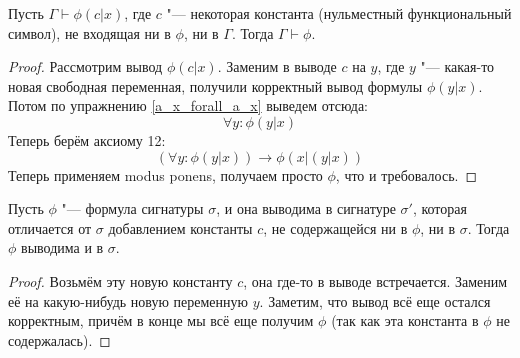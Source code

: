 \begin{lemma}\label{fresh_const_lemma}
	Пусть $\Gamma \vdash \phi(c|x)$, где $c$ "--- некоторая константа (нульместный функциональный символ), не входящая ни в $\phi$, ни в $\Gamma$.
	Тогда $\Gamma \vdash \phi$.
\end{lemma}
\begin{proof}
	Рассмотрим вывод $\phi(c|x)$.
	Заменим в выводе $c$ на $y$, где $y$ "--- какая-то новая свободная переменная, получили корректный вывод формулы $\phi(y|x)$.
	Потом по упражнению \ref{a_x_forall_a_x} выведем отсюда:
	\[ \forall y \colon \phi(y|x) \]
	Теперь берём аксиому 12:
	\[ (\forall y \colon \phi(y|x)) \to \phi(x|(y|x)) \]
	Теперь применяем modus ponens, получаем просто $\phi$, что и требовалось.
\end{proof}

\begin{lemma}
	Пусть $\phi$ "--- формула сигнатуры $\sigma$, и она выводима в сигнатуре $\sigma'$, которая отличается от $\sigma$ добавлением константы $c$,
	не содержащейся ни в $\phi$, ни в $\sigma$.
	Тогда $\phi$ выводима и в $\sigma$.
\end{lemma}
\begin{proof}
	Возьмём эту новую константу $c$, она где-то в выводе встречается.
	Заменим её на какую-нибудь новую переменную $y$.
	Заметим, что вывод всё еще остался корректным, причём в конце мы всё еще получим $\phi$
	(так как эта константа в $\phi$ не содержалась).
\end{proof}

